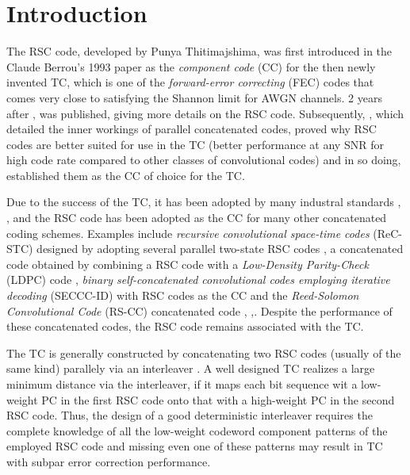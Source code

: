 \section{Introduction}

The RSC code, developed by Punya Thitimajshima, was first introduced in the Claude Berrou's 1993 paper \cite{Berrou93-05C} as the 
{\it component code} (CC) for the then newly invented TC, which is one of the \textit{forward-error correcting} (FEC) codes that comes very close to satisfying the Shannon limit for AWGN channels.  2 years after \cite{Berrou93-05C}, \cite{Thitimajshima95-11C} was published, giving more details on the RSC code. Subsequently, \cite{Benedetto96-05J}, which detailed the inner workings of parallel concatenated codes, proved why RSC codes are better suited for use in the TC (better performance at any SNR for high code rate compared to other classes of convolutional codes) and in so doing, established them as the CC of choice for the TC.

Due to the success of the TC,  it has been adopted by many industral standards \cite{802-16e-04S}, \cite{dvb-rcs2-S},\cite{LTE-S} and the RSC code has been adopted as the CC for many other concatenated coding schemes. Examples include {\it recursive convolutional space-time codes} (ReC-STC) designed by adopting several parallel two-state RSC codes \cite{Ying05-07L}, a concatenated code obtained by combining a RSC code with a {\it Low-Density Parity-Check} (LDPC) code \cite{Gounai06-06C}, {\it binary self-concatenated convolutional codes employing iterative decoding} (SECCC-ID) with RSC codes as the CC \cite{Butt08-11C} and the {\it Reed-Solomon Convolutional Code} (RS-CC) concatenated code \cite{Xu07-04C}, \cite{Byun10-09C},\cite{Joshi11-11C}.  Despite the performance of these concatenated codes, the RSC code remains associated with the TC.


 The TC is generally constructed by concatenating two RSC codes (usually of the same kind) parallely  via an interleaver . A well designed TC realizes a large minimum distance via the interleaver, if it maps each bit sequence wit a  low-weight PC in the first RSC code onto that with a high-weight PC in the second RSC code.
Thus, the design of a good deterministic interleaver requires the complete knowledge of all the low-weight codeword component patterns of the employed RSC code and missing even one of these patterns may result in TC with subpar error correction performance.

